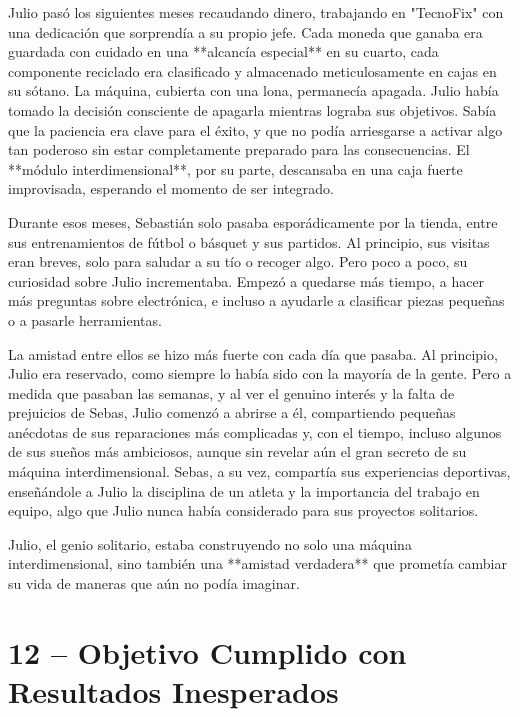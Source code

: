 \documentclass[a4paper,12pt]{book}
\begin{document}
Julio pasó los siguientes meses recaudando dinero, trabajando en "TecnoFix" con una dedicación que sorprendía a su propio jefe. Cada moneda que ganaba era guardada con cuidado en una **alcancía especial** en su cuarto, cada componente reciclado era clasificado y almacenado meticulosamente en cajas en su sótano. La máquina, cubierta con una lona, permanecía apagada. Julio había tomado la decisión consciente de apagarla mientras lograba sus objetivos. Sabía que la paciencia era clave para el éxito, y que no podía arriesgarse a activar algo tan poderoso sin estar completamente preparado para las consecuencias. El **módulo interdimensional**, por su parte, descansaba en una caja fuerte improvisada, esperando el momento de ser integrado.

Durante esos meses, Sebastián solo pasaba esporádicamente por la tienda, entre sus entrenamientos de fútbol o básquet y sus partidos. Al principio, sus visitas eran breves, solo para saludar a su tío o recoger algo. Pero poco a poco, su curiosidad sobre Julio incrementaba. Empezó a quedarse más tiempo, a hacer más preguntas sobre electrónica, e incluso a ayudarle a clasificar piezas pequeñas o a pasarle herramientas.

La amistad entre ellos se hizo más fuerte con cada día que pasaba. Al principio, Julio era reservado, como siempre lo había sido con la mayoría de la gente. Pero a medida que pasaban las semanas, y al ver el genuino interés y la falta de prejuicios de Sebas, Julio comenzó a abrirse a él, compartiendo pequeñas anécdotas de sus reparaciones más complicadas y, con el tiempo, incluso algunos de sus sueños más ambiciosos, aunque sin revelar aún el gran secreto de su máquina interdimensional. Sebas, a su vez, compartía sus experiencias deportivas, enseñándole a Julio la disciplina de un atleta y la importancia del trabajo en equipo, algo que Julio nunca había considerado para sus proyectos solitarios.

Julio, el genio solitario, estaba construyendo no solo una máquina interdimensional, sino también una **amistad verdadera** que prometía cambiar su vida de maneras que aún no podía imaginar.

\cleardoublepage %

\chapter*{12 – Objetivo Cumplido con Resultados Inesperados}
\end{document}
